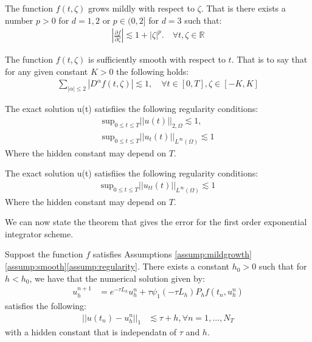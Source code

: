\begin{assumption}\label{assump:mildgrowth}
    The function $f(t,\zeta)$ grows mildly with respect to $\zeta$.
    That is there exists a number $p>0$ for $d=1,2$ or $p\in(0,2]$ for $d=3$ such that:
    \begin{align*}
        |\frac{\partial f}{\partial \zeta}| \lesssim 1 + |\zeta|^p. \quad \forall t,\zeta \in \mathbb{R}
    \end{align*}
\end{assumption}
\begin{assumption}\label{assump:smooth}
    The function $f(t, \zeta)$ is sufficiently smooth with respect to $t$.
    That is to say that for any given constant $K>0$ the following holds:
    \begin{align*}
        \sum_{|\alpha|\leq2}|D^{\alpha}f(t,\zeta)|\lesssim 1, \quad \forall t\in [0,T], \zeta \in[-K,K]
    \end{align*}
\end{assumption}
\begin{assumption}\label{assump:regularity}
    The exact solution u(t) satisfiies the following regularity conditions:
    \begin{align*}
        \text{sup}_{0\leq t \leq T}||u(t)||_{2,\Omega} \lesssim 1,\\
        \text{sup}_{0\leq t \leq T}||u_t(t)||_{L^\infty(\Omega)} \lesssim 1
    \end{align*}
    Where the hidden constant may depend on $T$.
\end{assumption}
\begin{assumption}\label{assump:regularity2}
    The exact solution u(t) satisfiies the following regularity conditions:
    \begin{align*}
        \text{sup}_{0\leq t \leq T}||u_{tt}(t)||_{L^\infty(\Omega)} \lesssim 1
    \end{align*}
    Where the hidden constant may depend on $T$.
\end{assumption}

We can now state the theorem that gives the error for the first order exponential integrator scheme.
\begin{theorem}\label{theorem:standard1}
    Suppost the function $f$ satisfies Assumptions \ref{assump:mildgrowth}\ref{assump:smooth}\ref{assump:regularity}.
    There exists a constant $h_0 > 0$ such that for $h<h_0$, we have that the numerical solution given by:
    \begin{align*}
        u_h^{n+1} &= e^{-\tau L_h}u_h^n + \tau \psi_1(-\tau L_h)P_hf(t_n,u_h^n)
    \end{align*}
    satisfies the following:
    \begin{align*}
        ||u(t_n) - u_h^n||_1 &\lesssim \tau + h, \forall n =1,...,N_T
    \end{align*}
    with a hidden constant that is independatn of $\tau$ and $h$.
\end{theorem}

